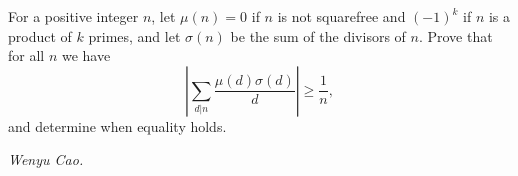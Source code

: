 For a positive integer $n$, let $\mu(n) = 0$ if $n$ is not squarefree and $(-1)^k$ if $n$ is a product of $k$ primes, and let $\sigma(n)$ be the sum of the divisors of $n$. Prove that for all $n$ we have
\[\left|\sum_{d|n}\frac{\mu(d)\sigma(d)}{d}\right| \geq \frac{1}{n}, \]
and determine when equality holds.

\textit{Wenyu Cao.}